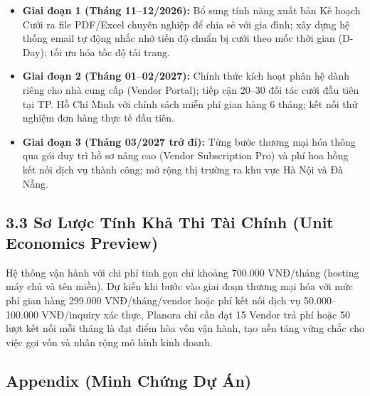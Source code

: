 \documentclass[11pt]{article}
\begin{document}
\begin{itemize}
    \item \textbf{Giai đoạn 1 (Tháng 11--12/2026):} Bổ sung tính năng xuất bản Kế hoạch Cưới ra file PDF/Excel chuyên nghiệp để chia sẻ với gia đình; xây dựng hệ thống email tự động nhắc nhở tiến độ chuẩn bị cưới theo mốc thời gian (D-Day); tối ưu hóa tốc độ tải trang.
    \item \textbf{Giai đoạn 2 (Tháng 01--02/2027):} Chính thức kích hoạt phân hệ dành riêng cho nhà cung cấp (Vendor Portal); tiếp cận 20--30 đối tác cưới đầu tiên tại TP. Hồ Chí Minh với chính sách miễn phí gian hàng 6 tháng; kết nối thử nghiệm đơn hàng thực tế đầu tiên.
    \item \textbf{Giai đoạn 3 (Tháng 03/2027 trở đi):} Từng bước thương mại hóa thông qua gói duy trì hồ sơ nâng cao (Vendor Subscription Pro) và phí hoa hồng kết nối dịch vụ thành công; mở rộng thị trường ra khu vực Hà Nội và Đà Nẵng.
\end{itemize}

\subsection*{3.3 Sơ Lược Tính Khả Thi Tài Chính (Unit Economics Preview)}
Hệ thống vận hành với chi phí tinh gọn chỉ khoảng 700.000 VNĐ/tháng (hosting máy chủ và tên miền). Dự kiến khi bước vào giai đoạn thương mại hóa với mức phí gian hàng 299.000 VNĐ/tháng/vendor hoặc phí kết nối dịch vụ 50.000--100.000 VNĐ/inquiry xác thực, Planora chỉ cần đạt 15 Vendor trả phí hoặc 50 lượt kết nối mỗi tháng là đạt điểm hòa vốn vận hành, tạo nền tảng vững chắc cho việc gọi vốn và nhân rộng mô hình kinh doanh.

\subsection*{Appendix (Minh Chứng Dự Án)}
\end{document}
